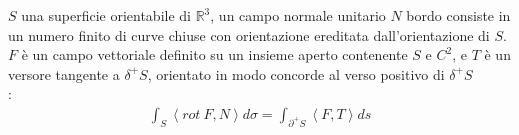 \documentclass[a4paper, oneside]{article}
\begin{document}
\begin{theorem}[di Stokes]
   $S$ una superficie orientabile di $\mathbb{R}^3$,  un campo normale unitario $N$  bordo consiste in un numero finito di curve chiuse con orientazione ereditata dall'orientazione di $S$.\\
   $F$ è un campo vettoriale definito su un insieme aperto contenente $S$ e $C^2$, e $T$ è 
  un versore tangente a $\delta^+ S$, orientato in modo concorde al verso positivo di $\delta^+ S$\\
  :
  \begin{gather*}
    \int_S \left\langle rot \ F, N \right\rangle d\sigma = \int_{\partial^+ S} \left\langle F, T \right\rangle ds  
  \end{gather*}
\end{theorem}
\end{document}
